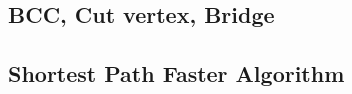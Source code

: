 \documentclass[10pt,landscape,a4paper,twocolumn]{article}
\begin{document}
%
\begin{comment}
\subsection{2-SAT}

$(b_{x} \lor b_{y}) \land (\neg b_{x} \lor b_{z}) \land (b_{z} \lor \neg b_{x}) \land \cdots$ ê°ì formì 2-CNFëŒê³  íš. ì£ŒìŽì§ 2-CNF ìì ì°žìŒë¡ íë $\{ b_1, b_2, \cdots \}$ ê° ì¡Žì¬íëì§, ì¡Žì¬íë€ë©Ž ê·ž ê°ì ë¬Žììžì§ êµ¬íë ë¬žì ë¥Œ 2-SATìŽëŒ íš.

boolean variable $b_{i}$ ë§ë€ $b_{i}$ë¥Œ ëíëŽë ì ì , $\neg b_{i} $ë¥Œ ëíëŽë ì ì  2ê°ë¥Œ ë§ëŠ. ê° clause $b_{i} \lor b_{j}$ ë§ë€ $\neg b_{i} \to b_{j}$, $\neg b_{j} \to b_{i}$ ìŽë ê² edgeë¥Œ ìŽìŽì€. ê·žë ê² ë§ë  ê·žëíìì SCCë¥Œ ë€ êµ¬íš. ìŽë€ SCC ìì $b_{i}$ ì $\neg b_{i}$ê° ê°ìŽ í¬íšëìŽìë€ë©Ž íŽê° ì¡Žì¬íì§ ìì. ìëëŒë©Ž íŽê° ì¡Žì¬íš.

íŽê° ì¡Žì¬í  ë êµ¬ì²Žì ìž íŽë¥Œ êµ¬íë ë°©ë². ììì SCCë¥Œ êµ¬íë©Žì SCC DAGë¥Œ ë§ë€ìŽì€ë€. ê±°êž°ì ììì ë ¬ì í í, ìììë¶í° SCCë¥Œ íëì© ëŽì€ë€. íì¬ ë³Žê³ ìë SCCì $b_{i}$ê° ìíŽìëë° ìê° $\neg b_{i}$ë³Žë€ ëšŒì  ë±ì¥íë€ë©Ž $b_{i} = \mathrm{false}$, ë°ëì ê²œì°ëŒë©Ž $b_{i} = \mathrm{true}$, ìŽë¯ž ê°ìŽ assignëìë€ë©Ž pass.
\end{comment}
\subsection{BCC, Cut vertex, Bridge}


\subsection{Shortest Path Faster Algorithm}


%

%
\end{document}
